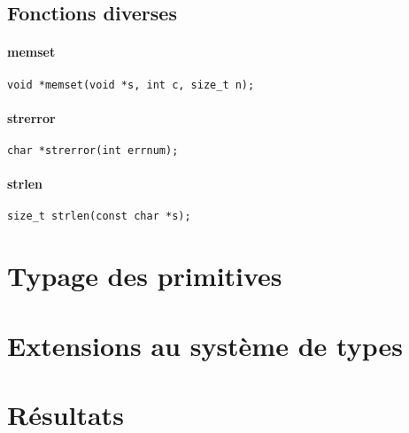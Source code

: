 \subsection{Fonctions diverses}

\paragraph{memset}
\begin{Verbatim}
void *memset(void *s, int c, size_t n);
\end{Verbatim}
\paragraph{strerror}
\begin{Verbatim}
char *strerror(int errnum);
\end{Verbatim}
\paragraph{strlen}
\begin{Verbatim}
size_t strlen(const char *s);
\end{Verbatim}

\section{Typage des primitives}

\section{Extensions au système de types}

\section{Résultats}%

